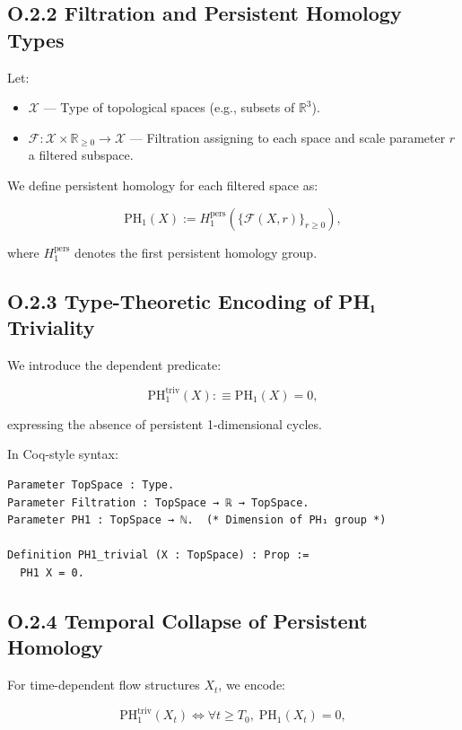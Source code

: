 \documentclass[11pt]{article}
\begin{document}
\subsection*{O.2.2 Filtration and Persistent Homology Types}

Let:

\begin{itemize}
  \item \( \mathcal{X} \) — Type of topological spaces (e.g., subsets of \( \mathbb{R}^3 \)).
  \item \( \mathcal{F} : \mathcal{X} \times \mathbb{R}_{\geq 0} \to \mathcal{X} \) — Filtration assigning to each space and scale parameter \( r \) a filtered subspace.
\end{itemize}

We define persistent homology for each filtered space as:

\[
\mathrm{PH}_1(X) := H_1^{\mathrm{pers}}\left( \{ \mathcal{F}(X, r) \}_{r \geq 0} \right),
\]

where \( H_1^{\mathrm{pers}} \) denotes the first persistent homology group.

\subsection*{O.2.3 Type-Theoretic Encoding of PH₁ Triviality}

We introduce the dependent predicate:

\[
\mathrm{PH}_1^{\mathrm{triv}}(X) :\equiv \mathrm{PH}_1(X) = 0,
\]

expressing the absence of persistent 1-dimensional cycles.

In Coq-style syntax:

\begin{lstlisting}[language=Coq]
Parameter TopSpace : Type.
Parameter Filtration : TopSpace → ℝ → TopSpace.
Parameter PH1 : TopSpace → ℕ.  (* Dimension of PH₁ group *)

Definition PH1_trivial (X : TopSpace) : Prop :=
  PH1 X = 0.
\end{lstlisting}

\subsection*{O.2.4 Temporal Collapse of Persistent Homology}

For time-dependent flow structures \( X_t \), we encode:

\[
\mathrm{PH}_1^{\mathrm{triv}}(X_t) \iff \forall t \geq T_0,\; \mathrm{PH}_1(X_t) = 0,
\]
\end{document}
